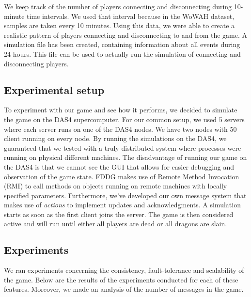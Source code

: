 We keep track of the number of players connecting and disconnecting during 10-minute time intervals.
We used that interval because in the WoWAH dataset, samples are taken every 10 minutes.
Using this data, we were able to create a realistic pattern of players connecting and disconnecting to and from the game.
A simulation file has been created, containing information about all events during 24 hours. This file can be used to actually run the simulation of connecting and disconnecting players.

\subsection{Experimental setup}
\label{subsec:experimental_setup}

	To experiment with our game and see how it performs, we decided to simulate the game on the DAS4 supercomputer.
	For our common setup, we used 5 servers where each server runs on one of the DAS4 nodes. We have two nodes with 50 client running on every node.
	By running the simulations on the DAS4, we guaranteed that we tested with a truly distributed system where processes were running on physical different machines.
	The disadvantage of running our game on the DAS4 is that we cannot see the GUI that allows for easier debugging and observation of the game state.
	FDDG makes use of Remote Method Invocation (RMI) to call methods on objects running on remote machines with locally specified parameters. 
	Furthermore, we've developed our own message system that makes use of \emph{actions} to implement updates and acknowledgments.
	A simulation starts as soon as the first client joins the server. The game is then considered active and will run until either all players are dead or all dragons are slain.


\subsection{Experiments}
\label{subsec:experiments}
	We ran experiments concerning the consistency, fault-tolerance and scalability of the game. Below are the results of the experiments conducted for each of these features. Moreover, we made an analysis of the number of messages in the game.

